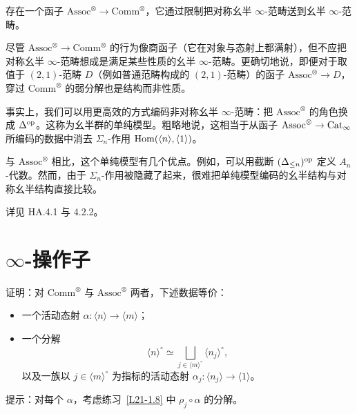 \nitem\label{L21-1.16} 存在一个函子 $\mathrm{Assoc}^{\otimes}\to\mathrm{Comm}^{\otimes}$，它通过限制把对称幺半 $\infty$-范畴送到幺半 $\infty$-范畴。

\begin{warning}\label{L21-1.17}
尽管 $\mathrm{Assoc}^{\otimes}\to\mathrm{Comm}^{\otimes}$ 的行为像商函子（它在对象与态射上都满射），但不应把对称幺半 $\infty$-范畴想成是满足某些性质的幺半 $\infty$-范畴。更确切地说，即便对于取值于 $(2,1)$-范畴 $D$（例如普通范畴构成的 $(2,1)$-范畴）的函子 $\mathrm{Assoc}^{\otimes}\to D$，穿过 $\mathrm{Comm}^{\otimes}$ 的弱分解也是结构而非性质。
\end{warning}

\begin{remark}\label{L21-1.18}
事实上，我们可以用更高效的方式编码非对称幺半 $\infty$-范畴：把 $\mathrm{Assoc}^{\otimes}$ 的角色换成 $\Delta^{\mathrm{op}}$。这称为幺半群的单纯模型。粗略地说，这相当于从函子 $\mathrm{Assoc}^{\otimes}\to\operatorname{Cat}_{\infty}$ 所编码的数据中消去 $\Sigma_n$-作用 $\operatorname{Hom}(\langle n\rangle,\langle 1\rangle)$。

与 $\mathrm{Assoc}^{\otimes}$ 相比，这个单纯模型有几个优点。例如，可以用截断 $(\Delta_{\le n})^{\mathrm{op}}$ 定义 $A_n$-代数。然而，由于 $\Sigma_n$-作用被隐藏了起来，很难把单纯模型编码的幺半结构与对称幺半结构直接比较。

详见 HA.4.1 与 4.2.2。
\end{remark}

\section{$\infty$-操作子}

\begin{exercise}\label{L21-2.1}
证明：对 $\mathrm{Comm}^{\otimes}$ 与 $\mathrm{Assoc}^{\otimes}$ 两者，下述数据等价：
\begin{itemize}[leftmargin=2.2em,itemsep=0.1em]
\item 一个活动态射 $\alpha\colon\langle n\rangle\to\langle m\rangle$；
\item 一个分解
\[
\langle n\rangle^{\circ}\simeq\bigsqcup_{j\in\langle m\rangle^{\circ}}\langle n_j\rangle^{\circ},
\]
以及一族以 $j\in\langle m\rangle^{\circ}$ 为指标的活动态射 $\alpha_j\colon\langle n_j\rangle\to\langle 1\rangle$。
\end{itemize}
提示：对每个 $\alpha$，考虑练习~\ref{L21-1.8} 中 $\rho_j\circ\alpha$ 的分解。
\end{exercise}

